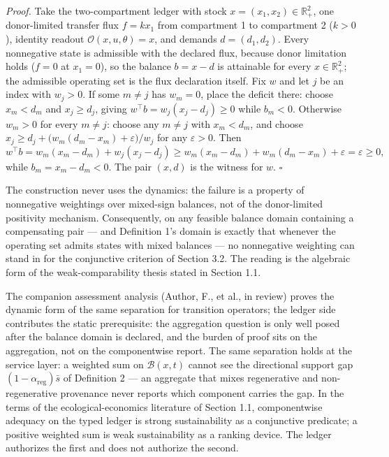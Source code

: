 \documentclass[11pt]{article}
\begin{document}
\emph{Proof.} Take the two-compartment ledger with stock
\(x = (x_1, x_2) \in \mathbb{R}^2_+\), one donor-limited transfer flux
\(f = kx_1\) from compartment 1 to compartment 2 (\(k > 0\)), identity
readout \(\mathcal{O}(x, u, \theta) = x\), and demands
\(d = (d_1, d_2)\). Every nonnegative state is admissible with the
declared flux, because donor limitation holds (\(f = 0\) at
\(x_1 = 0\)), so the balance \(b = x - d\) is attainable for every
\(x \in \mathbb{R}^2_+\); the admissible operating set is the flux
declaration itself. Fix \(w\) and let \(j\) be an index with
\(w_j > 0\). If some \(m \neq j\) has \(w_m = 0\), place the deficit
there: choose \(x_m < d_m\) and \(x_j \ge d_j\), giving
\(w^\top b = w_j (x_j - d_j) \ge 0\) while \(b_m < 0\). Otherwise
\(w_m > 0\) for every \(m \neq j\): choose any \(m \neq j\) with
\(x_m < d_m\), and choose
\(x_j \ge d_j + \bigl( w_m (d_m - x_m) + \varepsilon \bigr)/w_j\) for
any \(\varepsilon > 0\). Then
\[w^\top b = w_m (x_m - d_m) + w_j (x_j - d_j) \ge w_m (x_m - d_m) + w_m (d_m - x_m) + \varepsilon = \varepsilon \ge 0,\]
while \(b_m = x_m - d_m < 0\). The pair \((x, d)\) is the witness for
\(w\). \ensuremath{\square}

The construction never uses the dynamics: the failure is a property of
nonnegative weightings over mixed-sign balances, not of the
donor-limited positivity mechanism. Consequently, on any feasible
balance domain containing a compensating pair --- and Definition 1's
domain is exactly that whenever the operating set admits states with
mixed balances --- no nonnegative weighting can stand in for the
conjunctive criterion of Section 3.2. The reading is the algebraic form
of the weak-comparability thesis stated in Section 1.1.

The companion assessment analysis (Author, F., et al., in review) proves
the dynamic form of the same separation for transition operators; the
ledger side contributes the static prerequisite: the aggregation
question is only well posed after the balance domain is declared, and
the burden of proof sits on the aggregation, not on the componentwise
report. The same separation holds at the service layer: a weighted sum
on \(\mathcal{B}(x,t)\) cannot see the directional support gap
\((1 - \alpha_{\mathrm{reg}})\bar s\) of Definition 2 --- an aggregate
that mixes regenerative and non-regenerative provenance never reports
which component carries the gap. In the terms of the
ecological-economics literature of Section 1.1, componentwise adequacy
on the typed ledger is strong sustainability as a conjunctive predicate;
a positive weighted sum is weak sustainability as a ranking device. The
ledger authorizes the first and does not authorize the second.
\end{document}
